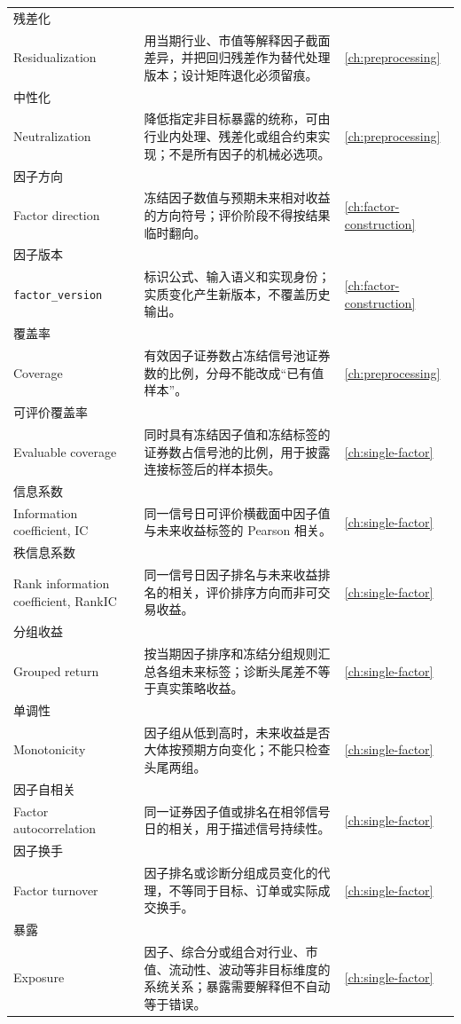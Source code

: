 \begin{longtable}{@{}p{3.2cm}p{9.0cm}p{2.8cm}@{}}
残差化\\Residualization & 用当期行业、市值等解释因子截面差异，并把回归残差作为替代处理版本；设计矩阵退化必须留痕。 & \cref{ch:preprocessing} \\
中性化\\Neutralization & 降低指定非目标暴露的统称，可由行业内处理、残差化或组合约束实现；不是所有因子的机械必选项。 & \cref{ch:preprocessing} \\
因子方向\\Factor direction & 冻结因子数值与预期未来相对收益的方向符号；评价阶段不得按结果临时翻向。 & \cref{ch:factor-construction} \\
因子版本\\\texttt{factor\_version} & 标识公式、输入语义和实现身份；实质变化产生新版本，不覆盖历史输出。 & \cref{ch:factor-construction} \\
覆盖率\\Coverage & 有效因子证券数占冻结信号池证券数的比例，分母不能改成“已有值样本”。 & \cref{ch:preprocessing} \\
可评价覆盖率\\Evaluable coverage & 同时具有冻结因子值和冻结标签的证券数占信号池的比例，用于披露连接标签后的样本损失。 & \cref{ch:single-factor} \\
信息系数\\Information coefficient, IC & 同一信号日可评价横截面中因子值与未来收益标签的 Pearson 相关。 & \cref{ch:single-factor} \\
秩信息系数\\Rank information coefficient, RankIC & 同一信号日因子排名与未来收益排名的相关，评价排序方向而非可交易收益。 & \cref{ch:single-factor} \\
分组收益\\Grouped return & 按当期因子排序和冻结分组规则汇总各组未来标签；诊断头尾差不等于真实策略收益。 & \cref{ch:single-factor} \\
单调性\\Monotonicity & 因子组从低到高时，未来收益是否大体按预期方向变化；不能只检查头尾两组。 & \cref{ch:single-factor} \\
因子自相关\\Factor autocorrelation & 同一证券因子值或排名在相邻信号日的相关，用于描述信号持续性。 & \cref{ch:single-factor} \\
因子换手\\Factor turnover & 因子排名或诊断分组成员变化的代理，不等同于目标、订单或实际成交换手。 & \cref{ch:single-factor} \\
暴露\\Exposure & 因子、综合分或组合对行业、市值、流动性、波动等非目标维度的系统关系；暴露需要解释但不自动等于错误。 & \cref{ch:single-factor} \\

\end{longtable}
